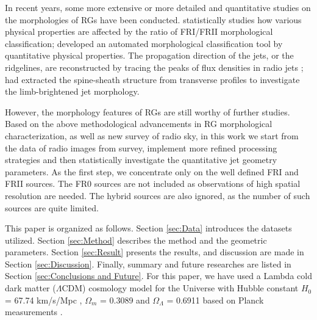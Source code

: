 \documentclass{aa}
\begin{document}
In recent years, some more extensive or more detailed and quantitative studies on the morphologies of RGs have been conducted.
\cite{lin_populations_2010} statistically studies how various physical properties are affected by the ratio of FRI/FRII morphological classification; 
\cite{mingo_revisiting_2019} developed an automated morphological classification tool by quantitative physical properties.  
The propagation direction of the jets, or the ridgelines, are reconstructed by tracing the peaks of flux densities in radio jets \citep[e.g.,][]{barkus_application_2021,velovic_collimation_2022,clews_radio-loud_2025}; 
\cite{park_discovery_2024,foschi_evolution_2025} had extracted the spine-sheath structure from transverse profiles to investigate the limb-brightened jet morphology. 

However, the morphology features of RGs  are still worthy of further studies.
Based on the above methodological advancements in RG morphological characterization, as well as new survey of radio sky, in this work we start from the data of radio images from survey, implement more refined processing strategies and then statistically investigate the quantitative jet geometry parameters.
As the first step, we concentrate only on the well defined FRI and FRII sources. 
The FR0 sources are not included as observations of high spatial resolution are needed. The hybrid sources are also ignored, as the number of such sources are quite limited. 



This paper is organized as follows. Section \ref{sec:Data} introduces the datasets utilized. Section \ref{sec:Method} describes the method and the geometric parameters. Section \ref{sec:Result} presents the results, and discussion are made in Section \ref{sec:Discussion}. Finally, summary and future researches are listed in Section \ref{sec:Conclusions and Future}.
For this paper, we have used a Lambda cold dark matter ($ \Lambda\text{CDM} $) cosmology model for the Universe with Hubble constant $H_{0}$ = 67.74 km/s/Mpc , $\Omega_m$ = 0.3089 and $\Omega_\Lambda$ = 0.6911 based on Planck measurements \citep{collaboration_planck_2016}.
\end{document}
